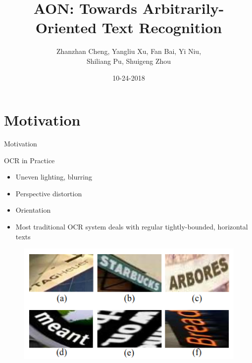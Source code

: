 \documentclass[compress]{beamer}
\title{AON: Towards Arbitrarily-Oriented Text Recognition}
\author[Presentor: Shih-Ming Wang]{Zhanzhan Cheng, Yangliu Xu, Fan Bai, Yi Niu, \\ Shiliang Pu, Shuigeng Zhou}
\institute[]{Presented by Shih-Ming Wang \\ ComputerVision Lab, UCSC}
\date{10-24-2018}
\begin{document}
\begin{frame}
    \maketitle
    \hypertarget{titlePage}{}
\end{frame}

\section{Motivation}
\begin{frame}{Motivation}
    \begin{block}{OCR in Practice}
        \begin{itemize}
            \item Uneven lighting, blurring
            \item Perspective distortion 
            \item Orientation
            \item Most traditional OCR system deals with regular tightly-bounded, horizontal texts
        \end{itemize} 
    \end{block}  
    \begin{figure}
        \includegraphics[height=.3\textheight]{motivation}
    \end{figure}
\end{frame}
\end{document}
